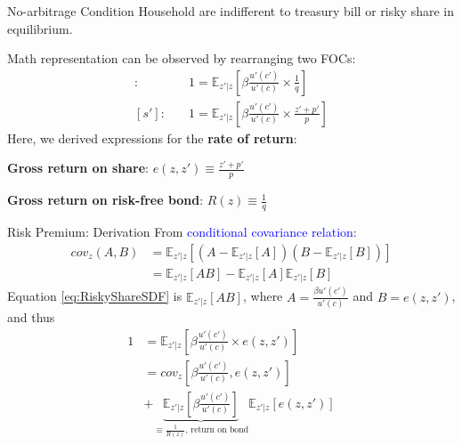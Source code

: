 \documentclass[aspectratio=169,xcolor=dvipsnames]{beamer}
\newcommand{\blue}[1]{\textcolor{blue}{#1}}
\let\tempone\itemize
\let\temptwo\enditemize
\renewenvironment{itemize}{\tempone\addtolength{\itemsep}{\fill}}{\temptwo}
\begin{document}
\begin{frame}{No-arbitrage Condition}
\label{slide:No_arbitrage_Condition}
    Household are indifferent to treasury bill or risky share in equilibrium.

    Math representation can be observed by rearranging two FOCs:
    \begin{align}
        [a']: \quad
            & 1 = \mathbb{E}_{z'|z} \left[
                \beta \frac{u'(c')}{u'(c)} \times  \frac{1}{q}
            \right]
        \\
        \label{eq:RiskyShareSDF}
        [s']: \quad
            & 1 = \mathbb{E}_{z'|z} \left[
                \beta \frac{u'(c')}{u'(c)} \times \frac{z' +p'}{p}
            \right]
    \end{align}
    Here, we derived expressions for the \textbf{rate of return}:
    \begin{itemize}
        \item \textbf{Gross return on share}: $e(z, z') \equiv  \frac{z' +p'}{p}$
        \item \textbf{Gross return on risk-free bond}: $R(z) \equiv  \frac{1}{q} $
    \end{itemize}

\end{frame}

\begin{frame}{Risk Premium: Derivation}
\label{slide:Risk_Premium__Derivation}
    From \blue{conditional covariance relation}:
    \begin{align}
        cov_{z}(A, B)
            & = \mathbb{E}_{z'|z} \left[
                \left(
                    A - \mathbb{E}_{z'|z}[A]
                \right)
                \left(
                    B - \mathbb{E}_{z'|z}[B]
                \right)
            \right]
        \\
            & = \mathbb{E}_{z'|z}\left[
                AB
            \right]
                -
                \mathbb{E}_{z'|z}[A] \mathbb{E}_{z'|z}[B]
    \end{align}
    Equation \eqref{eq:RiskyShareSDF} is $
        \mathbb{E}_{z'|z}\left[
                        AB
                    \right]
    $, where $ A = \frac{\beta u'(c')}{u'(c)} $ and $ B = e(z, z') $, and thus
    \begin{align}
        1
            & = \mathbb{E}_{z'|z} \left[
            \beta \frac{u'(c')}{u'(c)} \times e(z, z')
            \right]
        \\
            & =
        cov_{z}\left[
            \beta \frac{u'(c')}{u'(c)}, e(z, z')
        \right]
        \\
            &
        +
        \underbrace{
        \mathbb{E}_{z'|z}\left[
            \beta \frac{u'(c')}{u'(c)}
        \right]
        }_{\equiv \frac{1}{R(z)} \text{, return on bond}}
        \mathbb{E}_{z'|z} \left[
            e(z, z')
        \right]
    \end{align}
\end{frame}
\end{document}
